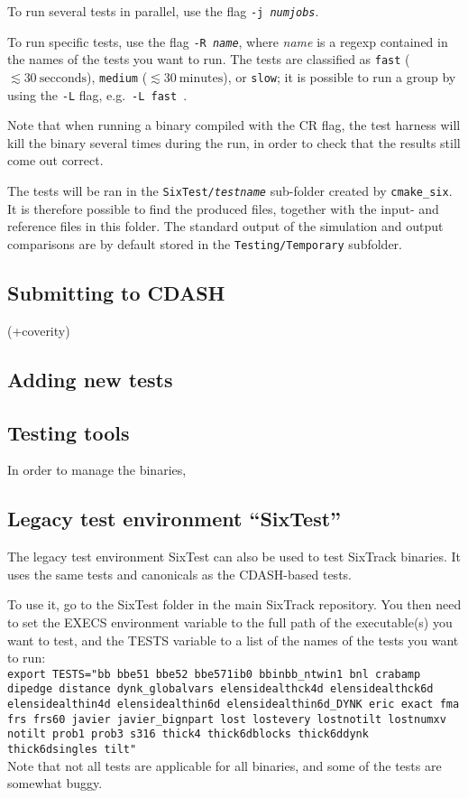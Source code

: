 \documentclass[english]{article}
\begin{document}
To run several tests in parallel, use the flag \texttt{-j \textit{numjobs}}.

To run specific tests, use the flag \texttt{-R \textit{name}}, where \textit{name} is a regexp contained in the names of the tests you want to run.
The tests are classified as \texttt{fast} ($\lesssim 30~\mathrm{secconds}$), \texttt{medium} ($\lesssim 30~\mathrm{minutes}$), or \texttt{slow}; it is possible to run a group by using the \texttt{-L} flag, e.g.\ \texttt{-L fast}~.

Note that when running a binary compiled with the CR flag, the test harness will kill the binary several times during the run, in order to check that the results still come out correct.

The tests will be ran in the \texttt{SixTest/\textit{testname}} sub-folder created by \texttt{cmake\_six}.
It is therefore possible to find the produced files, together with the input- and reference files in this folder.
The standard output of the simulation and output comparisons are by default stored in the \texttt{Testing/Temporary} subfolder.

\subsection{Submitting to CDASH}

(+coverity)

\subsection{Adding new tests}

\subsection{Testing tools}
In order to manage the binaries, 

\subsection{Legacy test environment ``SixTest''}

The legacy test environment SixTest can also be used to test SixTrack binaries.
It uses the same tests and canonicals as the CDASH-based tests.

To use it, go to the SixTest folder in the main SixTrack repository.
You then need to set the EXECS environment variable to the full path of the executable(s) you want to test, and the TESTS variable to a list of the names of the tests you want to run:\\
{
  \texttt{export TESTS="bb bbe51 bbe52 bbe571ib0  bbinbb\_ntwin1 bnl crabamp dipedge distance dynk\_globalvars elensidealthck4d elensidealthck6d elensidealthin4d elensidealthin6d elensidealthin6d\_DYNK eric exact fma frs frs60 javier javier\_bignpart lost lostevery lostnotilt lostnumxv notilt prob1 prob3 s316 thick4 thick6dblocks thick6ddynk thick6dsingles tilt"}
}\\
Note that not all tests are applicable for all binaries, and some of the tests are somewhat buggy.
\end{document}
